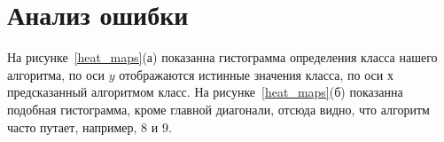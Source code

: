 \documentclass[12pt, twoside]{article}
\begin{document}
\section{Анализ ошибки}
На рисунке~\ref{heat_maps}(а) показанна гистограмма определения класса нашего алгоритма, по оси $y$ отображаются истинные значения класса, по оси $х$ предсказанный алгоритмом класс. На рисунке~\ref{heat_maps}(б) показанна подобная гистограмма, кроме главной диагонали, отсюда видно, что алгоритм часто путает, например, 8 и 9. 
\begin{figure}[h]
\begin{minipage}[h]{0.49\linewidth}
\end{minipage}
\hfill
\begin{minipage}[h]{0.49\linewidth}

\end{minipage}
\end{figure}
\end{document}
